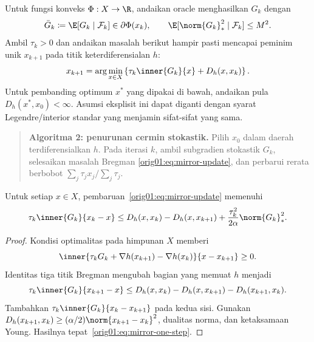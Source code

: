 Untuk fungsi konveks $\Phi:X\to\R$, andaikan oracle menghasilkan $G_k$
dengan
\begin{equation}
  \label{orig01:eq:mirror-oracle}
  \bar G_k\coloneqq\E[G_k\mid\mathcal F_k]\in\partial\Phi(x_k),
  \qquad
  \E[\norm{G_k}_*^2\mid\mathcal F_k]\leq M^2.
\end{equation}
Ambil $\tau_k>0$ dan andaikan masalah berikut hampir pasti mencapai peminim
unik $x_{k+1}$ pada titik keterdiferensialan $h$:
\begin{equation}
  \label{orig01:eq:mirror-update}
  x_{k+1}=\arg\min_{x\in X}
  \left\{\tau_k\inner{G_k}{x}+D_h(x,x_k)\right\}.
\end{equation}
Untuk pembanding optimum $x^*$ yang dipakai di bawah, andaikan pula
$D_h(x^*,x_0)<\infty$. Asumsi eksplisit ini dapat diganti dengan syarat
Legendre/interior standar yang menjamin sifat-sifat yang sama.

\begin{quote}
\textbf{Algoritma 2: penurunan cermin stokastik.}
Pilih $x_0$ dalam daerah terdiferensialkan $h$. Pada iterasi $k$, ambil
subgradien stokastik $G_k$, selesaikan masalah Bregman
\eqref{orig01:eq:mirror-update}, dan perbarui rerata berbobot
$\sum_j\tau_jx_j/\sum_j\tau_j$.
\end{quote}

\begin{lemma}
  \label{orig01:lemma:mirror-one-step}
  Untuk setiap $x\in X$, pembaruan~\eqref{orig01:eq:mirror-update} memenuhi
  \begin{equation}
    \label{orig01:eq:mirror-one-step}
    \tau_k\inner{G_k}{x_k-x}
    \leq D_h(x,x_k)-D_h(x,x_{k+1})
    +\frac{\tau_k^2}{2\alpha}\norm{G_k}_*^2.
  \end{equation}
\end{lemma}

\begin{proof}
  Kondisi optimalitas pada himpunan $X$ memberi
  \begin{equation}
    \inner{\tau_kG_k+\nabla h(x_{k+1})-\nabla h(x_k)}
           {x-x_{k+1}}\geq0.
  \end{equation}
  Identitas tiga titik Bregman mengubah bagian yang memuat $h$ menjadi
  \begin{equation}
    \tau_k\inner{G_k}{x_{k+1}-x}
    \leq D_h(x,x_k)-D_h(x,x_{k+1})-D_h(x_{k+1},x_k).
  \end{equation}
  Tambahkan $\tau_k\inner{G_k}{x_k-x_{k+1}}$ pada kedua sisi. Gunakan
  $D_h(x_{k+1},x_k)\geq(\alpha/2)\norm{x_{k+1}-x_k}^2$, dualitas norma, dan
  ketaksamaan Young. Hasilnya tepat~\eqref{orig01:eq:mirror-one-step}.
\end{proof}

